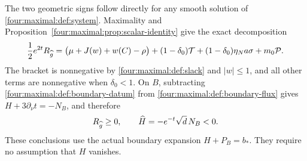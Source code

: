 The two geometric signs follow directly for any smooth solution of
\eqref{four:maximal:def:system}.  Maximality and Proposition~\ref{four:maximal:prop:scalar-identity}
give the exact decomposition
\begin{equation}\label{four:maximal:def:scalar-sign}
 \frac12e^{2t}R_{\widehat g}
 =\bigl(\mu+J(w)+w(C)-\rho\bigr)
  +(1-\delta_0)\mathcal T+(1-\delta_0)\eta_N a\sigma+m_0\mathcal P.
\end{equation}
The bracket is nonnegative by \eqref{four:maximal:def:slack} and $|w|\le1$, and all
other terms are nonnegative when $\delta_0<1$.  On $B$, subtracting
\eqref{four:maximal:def:boundary-datum} from \eqref{four:maximal:def:boundary-flux} gives
$H+3\partial_\nu t=-N_B$, and therefore
\begin{equation}\label{four:maximal:def:geometric-signs}
 R_{\widehat g}\ge0,\qquad \widehat H=-e^{-t}\sqrt d\,N_B<0.
\end{equation}
These conclusions use the actual boundary expansion $H+P_B=b_*$.
They require no assumption that $H$ vanishes.

